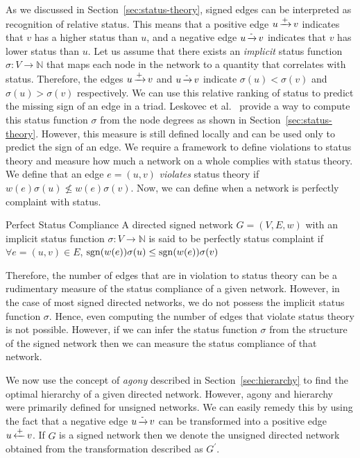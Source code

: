 As we discussed in Section~\ref{sec:status-theory}, signed edges can be interpreted as recognition of relative status.
This means that a positive edge $u \operatorname*{\xrightarrow{+}} v$ indicates that $v$ has a higher status than $u$, and a negative edge $u \operatorname*{\xrightarrow{-}} v$ indicates that $v$ has lower status than $u$.
Let us assume that there exists an \textit{implicit} status function $\sigma: V \rightarrow \mathbb{N}$ that maps each node in the network to a quantity that correlates with status.
Therefore, the edges $u\operatorname*{\xrightarrow{+}} v$ and $u \operatorname*{\xrightarrow{-}} v$ indicate $\sigma(u)<\sigma(v)$ and $\sigma(u)>\sigma(v)$ respectively.
We can use this relative ranking of status to predict the missing sign of an edge in a triad.
Leskovec et al.\ \cite{leskovec2010signed} provide a way to compute this status function $\sigma$ from the node degrees as shown in Section~\ref{sec:status-theory}.
However, this measure is still defined locally and can be used only to predict the sign of an edge.
We require a framework to define violations to status theory and measure how much a network on a whole complies with status theory.
We define that an edge $e=(u,v)$ \textit{violates} status theory if $w(e)\sigma(u)\not\leq w(e)\sigma(v)$.
Now, we can define when a network is perfectly complaint with status.

 \theoremstyle{definition}
 \begin{definition}{Perfect Status Compliance}
     A directed signed network $G=(V,E,w)$ with an implicit status function $\sigma: V \rightarrow \mathbb{N}$ is said to be perfectly status complaint if $\forall e=(u,v) \in E$, $\operatorname*{sgn}(w(e))\sigma(u) \leq \operatorname*{sgn}(w(e))\sigma(v)$ 
 \end{definition}

Therefore, the number of edges that are in violation to status theory can be a rudimentary measure of the status compliance of a given network.
However, in the case of most signed directed networks, we do not possess the implicit status function $\sigma$.
Hence, even computing the number of edges that violate status theory is not possible.
However, if we can infer the status function $\sigma$ from the structure of the signed network then we can measure the status compliance of that network. 

We now use the concept of \textit{agony} described in Section~\ref{sec:hierarchy} to find the optimal hierarchy of a given directed network.
However, agony and hierarchy were primarily defined for unsigned networks.
We can easily remedy this by using the fact that a negative edge $u \operatorname*{\xrightarrow{-}} v$ can be transformed into a positive edge $u \operatorname*{\xleftarrow{+}} v$.
If $G$ is a signed network then we denote the unsigned directed network obtained from the transformation described as $G^\prime$.


